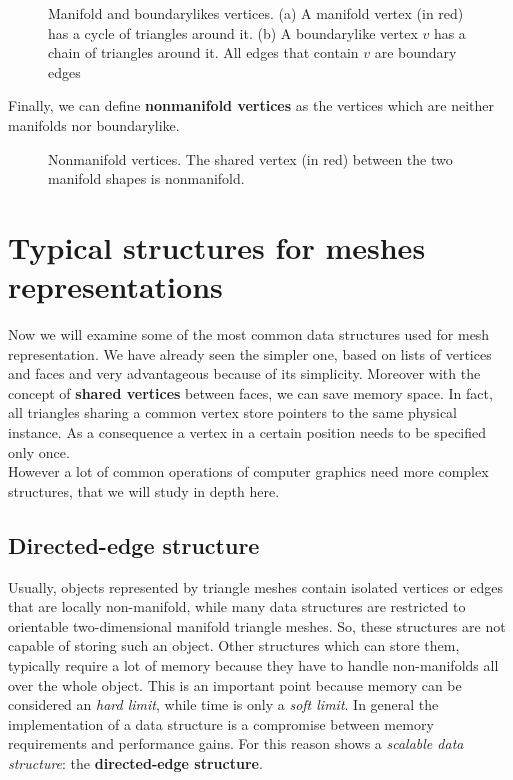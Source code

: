 \begin{figure}[htb] %
   \centering
   
   \caption[Manifold and boundarylikes vertices]{Manifold and boundarylikes vertices. (a) A manifold vertex (in red) has a cycle of triangles around it. (b)  A boundarylike vertex $v$ has a chain of triangles around it. All edges that contain $v$ are boundary edges}
   \label{fig:boundarylike}
\end{figure}

Finally, we can define \textbf{nonmanifold vertices} as the vertices which are neither manifolds nor boundarylike.

\begin{figure}[htb] %
   \centering
   
   \caption[Nonmanifold vertices]{Nonmanifold vertices. The shared vertex (in red) between the two manifold shapes is nonmanifold.}
   \label{fig:nonmanifold}
\end{figure}


\section{Typical structures for meshes representations}\label{sec14:meshStructures}

Now we will examine some of the most common data structures used for mesh representation. We have already seen the simpler one, based on lists of vertices and faces and very advantageous because of its simplicity. Moreover with the concept of \textbf{shared vertices} between faces, we can save memory space. In fact, all triangles sharing a common vertex store pointers to the same physical instance. As a consequence a vertex in a certain position needs to be specified only once.\\

However a lot of common operations of computer graphics need more complex structures, that we will study in depth here.

\subsection{Directed-edge structure}

Usually, objects represented by triangle meshes contain isolated vertices or edges that are locally non-manifold, while many data structures are restricted to orientable two-dimensional manifold triangle meshes. So, these structures are not capable of storing such an object. Other structures which can store them, typically require a lot of memory because they have to handle non-manifolds all over the whole object. This is an important point because memory can be considered an \textit{hard limit}, while time is only a \textit{soft limit}. In general the implementation of a data structure is a compromise between memory requirements and performance gains. For this reason \cite{Campagna} shows a \textit{scalable data structure}: the \textbf{directed-edge structure}.\\

